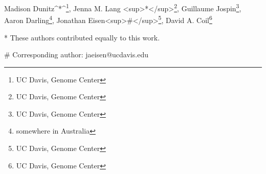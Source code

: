 Madison Dunitz^*^\footnote{UC Davis, Genome Center}, Jenna M. Lang <sup>*</sup>\footnote{UC Davis, Genome Center}, Guillaume Jospin\footnote{UC Davis, Genome Center}, Aaron Darling\footnote{somewhere in Australia}, Jonathan Eisen<sup>#</sup>\footnote{UC Davis, Genome Center}, David A. Coil\footnote{UC Davis, Genome Center} 

* These authors contributed equally to this work.

\# Corresponding author: jaeisen@ucdavis.edu